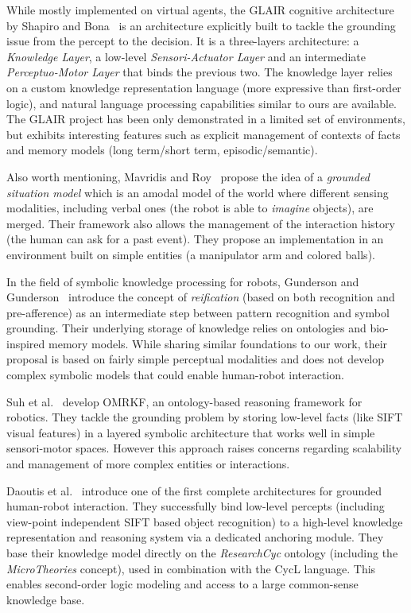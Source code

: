 \documentclass[twocolumn]{svjour3}
\begin{document}
While mostly implemented on virtual agents, the GLAIR cognitive architecture by
Shapiro and Bona~\cite{Shapiro2009} is an architecture explicitly built to
tackle the grounding issue from the percept to the decision. It is a
three-layers architecture: a \emph{Knowledge Layer}, a low-level
\emph{Sensori-Actuator Layer} and an intermediate \emph{Perceptuo-Motor Layer}
that binds the previous two.  The knowledge layer relies on a custom knowledge
representation language (more expressive than first-order logic), and natural
language processing capabilities similar to ours are available. The GLAIR
project has been only demonstrated in a limited set of environments, but
exhibits interesting features such as explicit management of contexts of facts
and memory models (long term/short term, episodic/semantic).

Also worth mentioning, Mavridis and Roy~\cite{Mavridis2005} propose the idea of
a \emph{grounded situation model} which is an amodal model of the world where
different sensing modalities, including verbal ones (the robot is able to
\emph{imagine} objects), are merged. Their framework also allows the management of
the interaction history (the human can ask for a past event). They propose an
implementation in an environment built on simple entities (a manipulator arm
and colored balls).

In the field of symbolic knowledge processing for robots, Gunderson and
Gunderson~\cite{Gunderson2008} introduce the concept of \emph{reification}
(based on both recognition and pre-afference) as an intermediate step between
pattern recognition and symbol grounding. Their underlying storage of knowledge
relies on ontologies and bio-inspired memory models. While sharing similar
foundations to our work, their proposal is based on fairly simple perceptual
modalities and does not develop complex symbolic models that could enable
human-robot interaction.

Suh et al.~\cite{Suh2007} develop {\sc OMRKF}, an ontology-based reasoning
framework for robotics. They tackle the grounding problem by storing low-level
facts (like SIFT visual features) in a layered symbolic architecture that works
well in simple sensori-motor spaces. However this approach raises concerns
regarding scalability and management of more complex entities or interactions.

Daoutis et al.~\cite{Daoutis2009} introduce one of the first complete
architectures for grounded human-robot interaction. They successfully bind
low-level percepts (including view-point independent SIFT based object
recognition) to a high-level knowledge representation and reasoning system via
a dedicated anchoring module. They base their knowledge model directly on the
\textit{ResearchCyc} ontology (including the \textit{MicroTheories} concept),
used in combination with the CycL language. This enables second-order
logic modeling and access to a large common-sense knowledge base.
\end{document}
